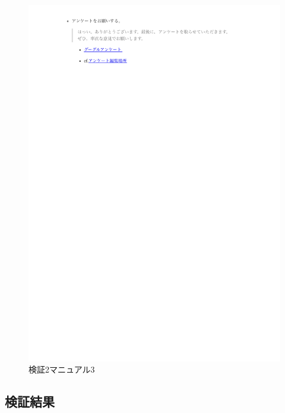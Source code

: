     \vspace{4cm}%
    \begin{figure}[H]
        \includegraphics[width=15cm]{./fig/chapter4/inspect_2/manual/manual_3.pdf}
        \caption{検証2マニュアル3}
        \label{検証２マニュアル３}
    \end{figure}



  \subsection{検証結果}
